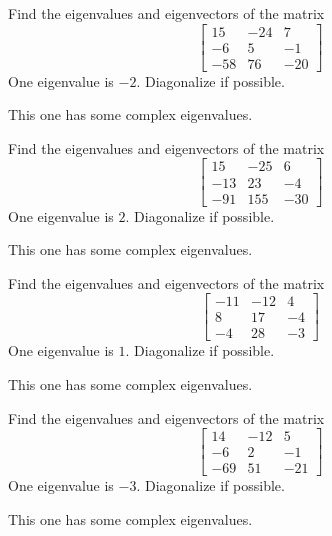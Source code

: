 \documentclass{ximera}
\begin{document}
\begin{problem}\label{prb:8.28} Find the eigenvalues and eigenvectors of the matrix
\begin{equation*}
\left[
\begin{array}{rrr}
15 & -24 & 7 \\
-6 & 5 & -1 \\
-58 & 76 & -20
\end{array}
\right]
\end{equation*}
One eigenvalue is $-2. $ Diagonalize if possible. 
\begin{hint}
This one has some complex eigenvalues.
\end{hint}
\end{problem}

\begin{problem}\label{prb:8.29} Find the eigenvalues and eigenvectors of the matrix
\begin{equation*}
\left[
\begin{array}{rrr}
15 & -25 & 6 \\
-13 & 23 & -4 \\
-91 & 155 & -30
\end{array}
\right]
\end{equation*}
One eigenvalue is $2.$ Diagonalize if possible.  
\begin{hint}
This one has some complex eigenvalues.
\end{hint}
\end{problem}

\begin{problem}\label{prb:8.30} Find the eigenvalues and eigenvectors of the matrix
\begin{equation*}
\left[
\begin{array}{rrr}
-11 & -12 & 4 \\
8 & 17 & -4 \\
-4 & 28 & -3
\end{array}
\right]
\end{equation*}
One eigenvalue is $1.$ Diagonalize if possible.  
\begin{hint}
This one has some complex eigenvalues.
\end{hint}
\end{problem}

\begin{problem}\label{prb:8.31} Find the eigenvalues and eigenvectors of the matrix
\begin{equation*}
\left[
\begin{array}{rrr}
14 & -12 & 5 \\
-6 & 2 & -1 \\
-69 & 51 & -21
\end{array}
\right]
\end{equation*}
One eigenvalue is $-3.$ Diagonalize if possible.  
\begin{hint}
This one has some complex eigenvalues.
\end{hint}
\end{problem}
\end{document}
